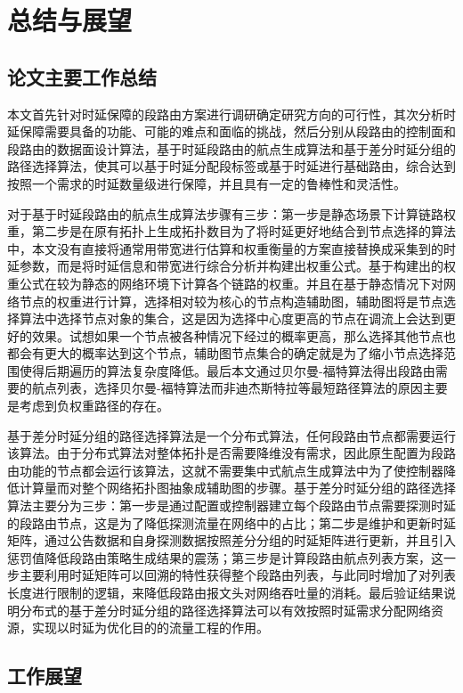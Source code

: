 \chapter{总结与展望}

\section{论文主要工作总结}

本文首先针对时延保障的段路由方案进行调研确定研究方向的可行性，其次分析时延保障需要具备的功能、可能的难点和面临的挑战，然后分别从段路由的控制面和段路由的数据面设计算法，基于时延段路由的航点生成算法和基于差分时延分组的路径选择算法，使其可以基于时延分配段标签或基于时延进行基础路由，综合达到按照一个需求的时延数量级进行保障，并且具有一定的鲁棒性和灵活性。

对于基于时延段路由的航点生成算法步骤有三步：第一步是静态场景下计算链路权重，第二步是在原有拓扑上生成拓扑数目为了将时延更好地结合到节点选择的算法中，本文没有直接将通常用带宽进行估算和权重衡量的方案直接替换成采集到的时延参数，而是将时延信息和带宽进行综合分析并构建出权重公式。基于构建出的权重公式在较为静态的网络环境下计算各个链路的权重。并且在基于静态情况下对网络节点的权重进行计算，选择相对较为核心的节点构造辅助图，辅助图将是节点选择算法中选择节点对象的集合，这是因为选择中心度更高的节点在调流上会达到更好的效果。试想如果一个节点被各种情况下经过的概率更高，那么选择其他节点也都会有更大的概率达到这个节点，辅助图节点集合的确定就是为了缩小节点选择范围使得后期遍历的算法复杂度降低。最后本文通过贝尔曼-福特算法得出段路由需要的航点列表，选择贝尔曼-福特算法而非迪杰斯特拉等最短路径算法的原因主要是考虑到负权重路径的存在。

基于差分时延分组的路径选择算法是一个分布式算法，任何段路由节点都需要运行该算法。由于分布式算法对整体拓扑是否需要降维没有需求，因此原生配置为段路由功能的节点都会运行该算法，这就不需要集中式航点生成算法中为了使控制器降低计算量而对整个网络拓扑图抽象成辅助图的步骤。基于差分时延分组的路径选择算法主要分为三步：第一步是通过配置或控制器建立每个段路由节点需要探测时延的段路由节点，这是为了降低探测流量在网络中的占比；第二步是维护和更新时延矩阵，通过公告数据和自身探测数据按照差分分组的时延矩阵进行更新，并且引入惩罚值降低段路由策略生成结果的震荡；第三步是计算段路由航点列表方案，这一步主要利用时延矩阵可以回溯的特性获得整个段路由列表，与此同时增加了对列表长度进行限制的逻辑，来降低段路由报文头对网络吞吐量的消耗。最后验证结果说明分布式的基于差分时延分组的路径选择算法可以有效按照时延需求分配网络资源，实现以时延为优化目的的流量工程的作用。

\section{工作展望}

